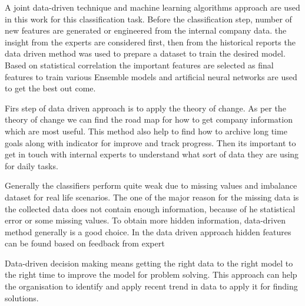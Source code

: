 

A joint data-driven technique and machine learning algorithms approach are used in this work for this classification task. Before the classification step, number of new features are generated or engineered from the internal company data. the insight from the experts are considered first, then from the historical reports the data driven method was used to prepare a dataset to train the desired model. Based on statistical correlation the important features are selected as final features to train various Ensemble models and artificial neural networks are used to get the best out come. 

Firs step of data driven approach is to apply the theory of change. As per the theory of change we can find the road map for how to get company information which are most useful. This method also help to find how to archive long time goals along with indicator for improve and track progress. Then its important to get in touch with internal experts to understand what sort of data they are using for daily tasks.

Generally the classifiers perform quite weak due to missing values and imbalance dataset for real life scenarios. The one of the major reason for the missing data is the collected data does not contain enough information, because of he statistical error or some missing values. To obtain more hidden
information, data-driven method generally is a good choice. In the data driven approach hidden features can be found based on feedback from expert

Data-driven decision making means getting the right data to the right model to the right time to improve the model for problem solving. This approach can help the organisation to identify and apply recent trend in data to apply it for finding solutions.

